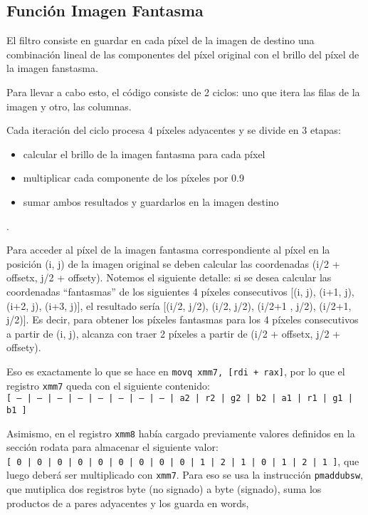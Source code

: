 \subsection{Función Imagen Fantasma}
\par El filtro consiste en guardar en cada píxel de la imagen de destino una combinación lineal de las componentes del píxel original con el brillo del píxel de la imagen fanstasma.
\par Para llevar a cabo esto, el código consiste de 2 ciclos: uno que itera las filas de la imagen y otro, las columnas.
\par Cada iteración del ciclo procesa 4 píxeles adyacentes y se divide en 3 etapas:
\begin{itemize}
	\item calcular el brillo de la imagen fantasma para cada píxel
	\item multiplicar cada componente de los píxeles por 0.9
	\item sumar ambos resultados y guardarlos en la imagen destino
\end{itemize}. 
\par Para acceder al píxel de la imagen fantasma correspondiente al píxel en la posición (i, j) de la imagen original se deben calcular las coordenadas (i/2 + offsetx,  j/2 + offsety). 
Notemos el siguiente detalle: si se desea calcular las coordenadas “fantasmas” de los siguientes 4 píxeles consecutivos [(i, j), (i+1, j), (i+2, j), (i+3, j)], 
el resultado sería  [(i/2, j/2), (i/2, j/2), (i/2+1 , j/2), (i/2+1, j/2)]. Es decir, para obtener los píxeles fantasmas para los 4 píxeles consecutivos a partir de (i, j), alcanza con traer 2 píxeles a partir de (i/2 + offsetx, j/2 + offsety).
\par Eso es exactamente lo que se hace en \texttt{movq xmm7, [rdi + rax]}, por lo que el registro \texttt{xmm7} queda con el siguiente contenido:\\
\texttt{[ -- | -- | -- | -- | -- | -- | -- | -- | a2 | r2 | g2 | b2 | a1 | r1 | g1 | b1 ]}
\par Asimismo, en el registro \texttt{xmm8} había cargado previamente valores definidos en la sección rodata para almacenar el siguiente valor:\\
\texttt{[ 0 | 0 | 0 | 0 | 0 | 0 | 0 | 0 | 0 | 1 | 2 | 1 | 0 | 1 | 2 | 1 ]}, 
que luego deberá ser multiplicado con \texttt{xmm7}. Para eso se usa la instrucción \texttt{pmaddubsw}, que mutiplica dos registros byte (no signado) a byte (signado), suma los productos de a pares adyacentes y los guarda en words, 
